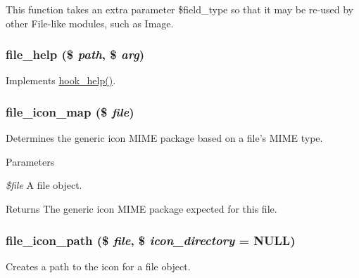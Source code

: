This function takes an extra parameter \$field\_\-type so that it may be re-\/used by other File-\/like modules, such as Image. \hypertarget{file_8module_a24c3b4fe327392636d2d409f07cf8266}{
\subsubsection[{file\_\-help}]{\setlength{\rightskip}{0pt plus 5cm}file\_\-help (\$ {\em path}, \/  \$ {\em arg})}}
\label{file_8module_a24c3b4fe327392636d2d409f07cf8266}
Implements \hyperlink{group__hooks_ga5589c2714a782738e8851c4c90231f0e}{hook\_\-help()}. \hypertarget{file_8module_a469ff5325a9180869170a3b9b09e09ea}{
\subsubsection[{file\_\-icon\_\-map}]{\setlength{\rightskip}{0pt plus 5cm}file\_\-icon\_\-map (\$ {\em file})}}
\label{file_8module_a469ff5325a9180869170a3b9b09e09ea}
Determines the generic icon MIME package based on a file's MIME type.


\begin{DoxyParams}{Parameters}
\item[{\em \$file}]A file object.\end{DoxyParams}
\begin{DoxyReturn}{Returns}
The generic icon MIME package expected for this file. 
\end{DoxyReturn}
\hypertarget{file_8module_a567cc64128c525052f215ebe1a2b5dd8}{
\subsubsection[{file\_\-icon\_\-path}]{\setlength{\rightskip}{0pt plus 5cm}file\_\-icon\_\-path (\$ {\em file}, \/  \$ {\em icon\_\-directory} = {\ttfamily NULL})}}
\label{file_8module_a567cc64128c525052f215ebe1a2b5dd8}
Creates a path to the icon for a file object.


